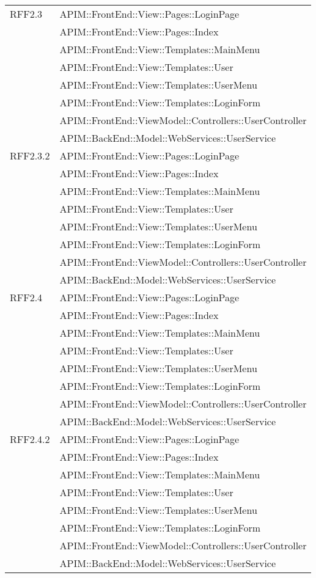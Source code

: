 \begin{longtable}{ p{4cm} | p{12cm} }
		    \hline RFF2.3
		    & APIM::FrontEnd::View::Pages::LoginPage \\
		    & APIM::FrontEnd::View::Pages::Index \\
		    & APIM::FrontEnd::View::Templates::MainMenu \\
		    & APIM::FrontEnd::View::Templates::User \\
		    & APIM::FrontEnd::View::Templates::UserMenu \\
		    & APIM::FrontEnd::View::Templates::LoginForm \\
			& APIM::FrontEnd::ViewModel::Controllers::UserController \\
			& APIM::BackEnd::Model::WebServices::UserService \\
			
		    \hline RFF2.3.2
		    & APIM::FrontEnd::View::Pages::LoginPage \\
		    & APIM::FrontEnd::View::Pages::Index \\
		    & APIM::FrontEnd::View::Templates::MainMenu \\
		    & APIM::FrontEnd::View::Templates::User \\
		    & APIM::FrontEnd::View::Templates::UserMenu \\
		    & APIM::FrontEnd::View::Templates::LoginForm \\
			& APIM::FrontEnd::ViewModel::Controllers::UserController \\
			& APIM::BackEnd::Model::WebServices::UserService \\
			
		    \hline RFF2.4
		    & APIM::FrontEnd::View::Pages::LoginPage \\
		    & APIM::FrontEnd::View::Pages::Index \\
		    & APIM::FrontEnd::View::Templates::MainMenu \\
		    & APIM::FrontEnd::View::Templates::User \\
		    & APIM::FrontEnd::View::Templates::UserMenu \\
		    & APIM::FrontEnd::View::Templates::LoginForm \\
			& APIM::FrontEnd::ViewModel::Controllers::UserController \\
			& APIM::BackEnd::Model::WebServices::UserService \\
			
		    \hline RFF2.4.2
		    & APIM::FrontEnd::View::Pages::LoginPage \\
		    & APIM::FrontEnd::View::Pages::Index \\
		    & APIM::FrontEnd::View::Templates::MainMenu \\
		    & APIM::FrontEnd::View::Templates::User \\
		    & APIM::FrontEnd::View::Templates::UserMenu \\
		    & APIM::FrontEnd::View::Templates::LoginForm \\
			& APIM::FrontEnd::ViewModel::Controllers::UserController \\
			& APIM::BackEnd::Model::WebServices::UserService \\
			

\end{longtable}
